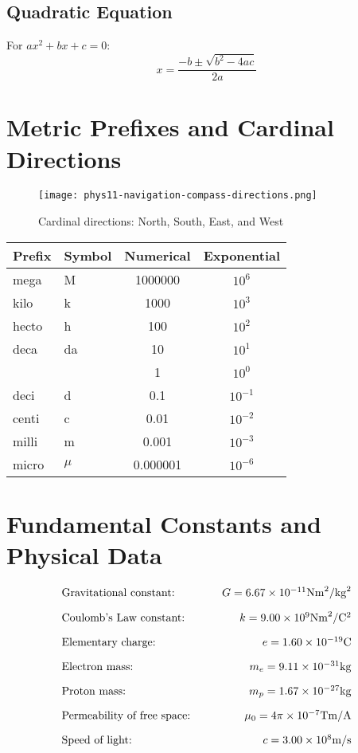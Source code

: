 \documentclass[12pt,a4paper]{article}
\begin{document}
\subsection{Quadratic Equation}
For $ax^2 + bx + c = 0$: 
\[x = \frac{-b \pm \sqrt{b^2 - 4ac}}{2a}\]

\section{Metric Prefixes and Cardinal Directions}
\begin{figure}[H]
    \centering
    \texttt{[image: phys11-navigation-compass-directions.png]}
    \caption{Cardinal directions: North, South, East, and West}
    \label{fig:Cardinal directions}
\end{figure}

\begin{table}[H]
\centering
\begin{tabular}{@{}llcc@{}}
\toprule
Prefix & Symbol & Numerical & Exponential \\
\midrule
mega & M & 1000000 & $10^6$ \\
kilo & k & 1000 & $10^3$ \\
hecto & h & 100 & $10^2$ \\
deca & da & 10 & $10^1$ \\
 &  & 1 & $10^0$ \\
deci & d & 0.1 & $10^{-1}$ \\
centi & c & 0.01 & $10^{-2}$ \\
milli & m & 0.001 & $10^{-3}$ \\
micro & $\mu$ & 0.000001 & $10^{-6}$ \\
\bottomrule
\end{tabular}
\end{table}

\section{Fundamental Constants and Physical Data}

\begin{align*}
  \begin{array}{l@{\hspace{1cm}}r}
    \text{Gravitational constant:} & G=6.67 \times 10^{-11} \mathrm{Nm}^2/\mathrm{kg}^2 \\[1em]
    \text{Coulomb's Law constant:} & k=9.00 \times 10^9 \mathrm{Nm}^2/\mathrm{C}^2 \\[1em]
    \text{Elementary charge:} & e=1.60 \times 10^{-19} \mathrm{C} \\[1em]
    \text{Electron mass:} & m_e=9.11 \times 10^{-31} \mathrm{kg} \\[1em]
    \text{Proton mass:} & m_p=1.67 \times 10^{-27} \mathrm{kg} \\[1em]
    \text{Permeability of free space:} & \mu_0=4\pi \times 10^{-7} \mathrm{Tm}/\mathrm{A} \\[1em]
    \text{Speed of light:} & c=3.00 \times 10^8 \mathrm{m}/\mathrm{s}
  \end{array}
\end{align*}
\end{document}

